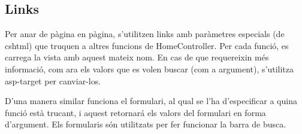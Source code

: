 \subsection{Links}
Per anar de p\`agina en p\`agina,
s'utilitzen links amb par\`ametres especials (de cshtml)
que truquen a altres funcions de HomeController.
Per cada funci\'o, es carrega la vista amb aquest mateix nom.
En cas de que requereixin m\'es informaci\'o,
com ara els valors que es volen buscar (com a argument),
s'utilitza asp-target per canviar-los.

D'una manera similar funciona el formulari,
al qual se l'ha d'especificar a quina funci\'o est\`a trucant,
i aquest retornar\'a els valors del formulari en forma d'argument.
Els formularis s\'on utilitzats per fer funcionar la barra de busca.

